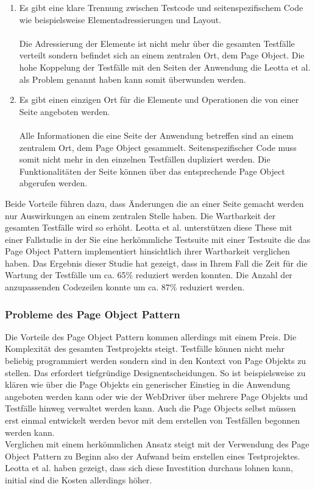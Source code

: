 \begin{enumerate}
\item Es gibt eine klare Trennung zwischen Testcode und seitenspezifischem Code wie beispielsweise Elementadressierungen und Layout. \\ \\
Die Adressierung der Elemente ist nicht mehr über die gesamten Testfälle verteilt sondern befindet sich an einem zentralen Ort, dem Page Object.
Die hohe Koppelung der Testfälle mit den Seiten der Anwendung die Leotta et al. \cite{leotta_repairing_2013} als Problem genannt haben kann somit überwunden werden.

\item Es gibt einen einzigen Ort für die Elemente und Operationen die von einer Seite angeboten werden. \\ \\
Alle Informationen die eine Seite der Anwendung betreffen sind an einem zentralem Ort, dem Page Object gesammelt. Seitenspezifischer Code muss somit nicht mehr in den einzelnen Testfällen dupliziert werden. Die Funktionalitäten der Seite können über das entsprechende Page Object abgerufen werden.

\end{enumerate}

Beide Vorteile führen dazu, dass Änderungen die an einer Seite gemacht werden nur Auswirkungen an einem zentralen Stelle haben. Die Wartbarkeit der gesamten Testfälle wird so erhöht.
Leotta et al. unterstützen diese These mit einer Fallstudie \cite{leotta_repairing_2013} in der Sie eine herkömmliche Testsuite mit einer Testsuite die das Page Object Pattern implementiert hinsichtlich ihrer Wartbarkeit verglichen haben.
Das Ergebnis dieser Studie hat gezeigt, dass in Ihrem Fall die Zeit für die Wartung der Testfälle um ca. 65\% reduziert werden konnten. Die Anzahl der anzupassenden Codezeilen konnte um ca. 87\% reduziert werden.

\subsubsection{Probleme des Page Object Pattern}
\label{sec:probleme_des_page_object_pattern}

Die Vorteile des Page Object Pattern kommen allerdings mit einem Preis. Die Komplexität des gesamten Testprojekts steigt. Testfälle können nicht mehr beliebig programmiert werden sondern sind in den Kontext von Page Objekts zu stellen. Das erfordert tiefgründige Designentscheidungen. So ist beispielsweise zu klären wie über die Page Objekts ein generischer Einstieg in die Anwendung angeboten werden kann oder wie der WebDriver über mehrere Page Objekts und Testfälle hinweg verwaltet werden kann. Auch die Page Objects selbst müssen erst einmal entwickelt werden bevor mit dem erstellen von Testfällen begonnen werden kann.\\
Verglichen mit einem herkömmlichen Ansatz steigt mit der Verwendung des Page Object Pattern zu Beginn also der Aufwand beim erstellen eines Testprojektes. Leotta et al. \cite{leotta_repairing_2013} haben gezeigt, dass sich diese Investition durchaus lohnen kann, initial sind die Kosten allerdings höher.

